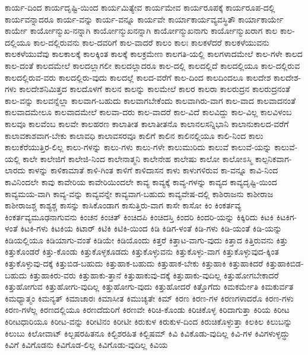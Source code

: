 {ಕಾರ್ಯ-ದಿಂದ
ಕಾರ್ಯದೃಷ್ಟಿ-ಯಿಂದ
ಕಾರ್ಯಮಿತ್ಯೇವ
ಕಾರ್ಯಮೇವ
ಕಾರ್ಯರೂಪಕ್ಕೆ
ಕಾರ್ಯರೂಪ-ದಲ್ಲಿ
ಕಾರ್ಯವನ್ನಾದರೂ
ಕಾರ್ಯ-ವನ್ನು
ಕಾರ್ಯ-ವನ್ನೂ
ಕಾರ್ಯವೇ
ಕಾರ್ಯಾಕಾರ್ಯವ್ಯವಸ್ಥಿತೌ
ಕಾರ್ಯಾಕಾರ್ಯೇ
ಕಾರ್ಯೇ
ಕಾರ್ಯೋನ್ಮುಖ-ನನ್ನಾಗಿ
ಕಾರ್ಯೋನ್ಮುಖನನ್ನಾಗಿ
ಕಾರ್ಯೋನ್ಮುಖನಾಗು
ಕಾರ್ಯೋನ್ಮುಖರಾಗ
ಕಾಲ
ಕಾಲ-ದಲ್ಲಿಯೂ
ಕಾಲ-ದಲ್ಲಿರುವನು
ಕಾಲ-ದವರಿಗೆ
ಕಾಲ-ವಾದರೆ
ಕಾಲಂ
ಕಾಲಃ
ಕಾಲಕಳೆದರೆ
ಕಾಲಕಳೆಯುವನು
ಕಾಲಕಳೆಯುವೆವು
ಕಾಲಕಾಲಕ್ಕೆ
ಕಾಲಕ್ಕಿಂತ
ಕಾಲಕ್ಕೆ
ಕಾಲಕ್ರಮೇಣ
ಕಾಲಗತಿ-ಯಲ್ಲಿ
ಕಾಲಗಳಾದಮೇಲೆ
ಕಾಲ-ಗಳೇ
ಕಾಲದ
ಕಾಲ-ದಂತೆ
ಕಾಲದಮೇಲೆ
ಕಾಲದಲ್ಲಾಗಲೀ
ಕಾಲದಲ್ಲಾದರೂ
ಕಾಲ-ದಲ್ಲಿ
ಕಾಲದಲ್ಲಿದೆ
ಕಾಲದಲ್ಲಿಯೂ
ಕಾಲ-ದಲ್ಲಿರುವ
ಕಾಲದಲ್ಲಿರುವ-ವರು
ಕಾಲದಲ್ಲಿರು-ವುದು
ಕಾಲದಲ್ಲೆ
ಕಾಲದ-ವರೆಗೆ
ಕಾಲ-ದಿಂದ
ಕಾಲದಿಂದಲೂ
ಕಾಲದೇಶ
ಕಾಲದೇಶ-ಗಳು
ಕಾಲದೇಶನಿಮಿತ್ತದ
ಕಾಲದೊಳಗೆ
ಕಾಲನ
ಕಾಲನ್ನು
ಕಾಲಮೇಲೆ
ಕಾಲರ
ಕಾಲರಾ
ಕಾಲರುದ್ರನ
ಕಾಲರುದ್ರನಂತೆ
ಕಾಲ-ವನ್ನು
ಕಾಲವನ್ನೆಲ್ಲಾ
ಕಾಲವಾಗ-ಬಹುದು
ಕಾಲವಾಗಬೇಕೆಂದು
ಕಾಲವಾಗಿರು-ವಾಗ
ಕಾಲ-ವಾದ
ಕಾಲವಾದನಂತೆ
ಕಾಲವಾದಮೇಲೂ
ಕಾಲವಾದಮೇಲೆ
ಕಾಲವಾ-ದರು
ಕಾಲ-ವಾದರೆ
ಕಾಲ-ವಿದೆ
ಕಾಲವಿದ್ದು
ಕಾಲ-ವಿಲ್ಲ
ಕಾಲವಿಳಂಬ
ಕಾಲವೂ
ಕಾಲವೆಂಬ
ಕಾಲವೇ
ಕಾಲಹರಣ
ಕಾಲಾತೀತ
ಕಾಲಾತೀತನೊ
ಕಾಲಾನಲಸನ್ನಿಭಾನಿ
ಕಾಲಾನುಕಾಲದ-ವರೆಗೆ
ಕಾಲಾವಕಾಶವಾಗ-ಬೇಕು
ಕಾಲಾವಧಿ
ಕಾಲಾವಸರವೂ
ಕಾಲಿಗೆ
ಕಾಲಿನ
ಕಾಲಿನಲ್ಲಿಯೂ
ಕಾಲಿ-ನಿಂದ
ಕಾಲು
ಕಾಲುಕೆರೆಯುತ್ತಿರ-ಲಿಲ್ಲ
ಕಾಲು-ಗಳನ್ನು
ಕಾಲು-ಗಳು
ಕಾಲು-ಗಳೇ
ಕಾಲುಮುರಿದು
ಕಾಲುವೆ
ಕಾಲುವೆ-ಯನ್ನು
ಕಾಲುವೆ-ಯಲ್ಲಿ
ಕಾಲೇ
ಕಾಲೇಜಿಗೆ
ಕಾಲೇಜಿ-ನಿಂದ
ಕಾಲೇನಾತ್ಮನಿ
ಕಾಲೇನೇಹ
ಕಾಲೇಷು
ಕಾಲೋ
ಕಾಲೋಽಸ್ಮಿ
ಕಾಲ್ಪನಿಕವಾಗ-ಲಾರದು
ಕಾಳನ್ನು
ಕಾಳಿಕಾಮಾತೆ
ಕಾಳಿ-ಗಿಂತ
ಕಾಳಿಗೆ
ಕಾಳಿದಾಸನ
ಕಾಳು
ಕಾಳುಗಳಿರುವ
ಕಾ-ವನ್ನೂ
ಕಾವಿ-ನಿಂದ
ಕಾವಿನಿಂದಲೇ
ಕಾವು
ಕಾವೇರಿಯ
ಕಾವೇರಿಯಿಂದಲೇ
ಕಾವ್ಯ
ಕಾವ್ಯಕ್ಕೆ
ಕಾವ್ಯ-ಗಳನ್ನು
ಕಾವ್ಯದ
ಕಾವ್ಯದೃಷ್ಟಿ-ಯಿಂದ
ಕಾವ್ಯಮಯ-ವಾಗಿ
ಕಾವ್ಯ-ವನ್ನು
ಕಾವ್ಯವನ್ನೇ
ಕಾವ್ಯವಾಗ-ಬಹುದು
ಕಾವ್ಯವೇಷ-ದಲ್ಲಿ
ಕಾಶಿರಾಜನು
ಕಾಶೀರಾಜ
ಕಾಶೀರಾಜಶ್ಚ
ಕಾಶ್ಯಶ್ಚ
ಕಾಸನ್ನು
ಕಾಸಿಕೊಂಡಾಗ
ಕಾಸುತ್ತಿರು-ವಾಗ
ಕಾಸೇ
ಕಾಸೋ
ಕಿಂ
ಕಿಂಕರ್ತವ್ಯ
ಕಿಂಕರ್ತವ್ಯಮೂಢನಾಗುವನು
ಕಿಂಚನ
ಕಿಂಚಿತ್
ಕಿಂಚಿದಪಿ
ಕಿಂಚಿದಸ್ತಿ
ಕಿಂದರಿ
ಕಿಂದರಿ-ಯನ್ನು
ಕಿಕ್ಕಿರಿದು
ಕಿಟಕಿ
ಕಿಟಕಿಗ-ಳಂತೆ
ಕಿಟಕಿ-ಗಳು
ಕಿಟಕಿಯ
ಕಿಟಾರ್
ಕಿಟಿಕಿ
ಕಿಟಿಕಿ-ಯಿಂದ
ಕಿಡಿ
ಕಿಡಿಗ-ಳಂತೆ
ಕಿಡಿ-ಗಳು
ಕಿಡಿ-ಯಂತೆ
ಕಿಡಿ-ಯನ್ನು
ಕಿಡಿಯಲ್ಲಿಯೂ
ಕಿಡಿಯಾಗು-ವಂತೆ
ಕಿಡಿಯೇ
ಕಿಡಿಯೊಂದು
ಕಿತ್ತರೆ
ಕಿತ್ತಾಟ-ವಾಗು-ವುದು
ಕಿತ್ತಾದ
ಕಿತ್ತಿರುವನು
ಕಿತ್ತು
ಕಿತ್ತುಕೊಂಡರೆ
ಕಿತ್ತು-ಕೊಂಡು
ಕಿತ್ತುಕೊಳ್ಳಕೂಡದು
ಕಿತ್ತುಕೊಳ್ಳುವನು
ಕಿತ್ತುಕೊಳ್ಳು-ವಾಗ
ಕಿತ್ತುಕೊಳ್ಳುವುದ-ಕ್ಕಿಂತ
ಕಿತ್ತುಕೊಳ್ಳುವು-ದಕ್ಕೆ
ಕಿತ್ತುಬಿಡ-ಬಹುದು
ಕಿತ್ತುಹಾಕ-ಬಹುದು
ಕಿತ್ತುಹಾಕ-ಬೇಕು
ಕಿತ್ತುಹಾಕಿ
ಕಿತ್ತುಹಾಕಿದರೆ
ಕಿತ್ತುಹಾಕಿಬಿಡ-ಬಹುದು
ಕಿತ್ತುಹಾಕಿರು-ವರು
ಕಿತ್ತುಹಾಕು-ತ್ತಾನೆ
ಕಿತ್ತುಹಾಕುವು-ದಕ್ಕೆ
ಕಿತ್ತುಹಾಕು-ವುದಿಲ್ಲ
ಕಿತ್ತುಹೋಗಬೇಕಾದರೆ
ಕಿತ್ತುಹೋಗುವ
ಕಿತ್ತುಹೋಗು-ವುದಿಲ್ಲ
ಕಿತ್ತುಹೋಗು-ವುದು
ಕಿತ್ತುಹೋದರೆ
ಕಿತ್ತೊಗೆದು
ಕಿಮಕರ್ಮೇತಿ
ಕಿಮಕುರ್ವತ
ಕಿಮಧ್ಯಾತ್ಮಂ
ಕಿಮನ್ಯತ್
ಕಿಮಾಚಾರಃ
ಕಿಮಾಸೀತ
ಕಿಮುಚ್ಯತೇ
ಕಿಮ್
ಕಿರಣ
ಕಿರಣ-ಗಳ
ಕಿರಣಗಳಾದರೊ
ಕಿರಣ-ಗಳು
ಕಿರಣ-ಗಳೆಲ್ಲ
ಕಿರಣದಲ್ಲಿಯೂ
ಕಿರಣದೆದುರಿಗೆ
ಕಿರಣವೇ
ಕಿರಿಚಿ-ಕೊಂಡು
ಕಿರಿಚಿಕೊಳ್ಳ
ಕಿರಿದಾಗುತ್ತಾ
ಕಿರಿಯ
ಕಿರೀಟ
ಕಿರೀಟಧಾರಿಯೂ
ಕಿರೀಟ-ವನ್ನು
ಕಿರೀಟಿನಂ
ಕಿರೀಟೀ
ಕಿರುಕುಳ
ಕಿರುಕುಳ-ದಿಂದ
ಕಿರುಚಿಕೊಳ್ಳುತ್ತಾ
ಕಿಲಕಿಲ
ಕಿಲುಬನ್ನು
ಕಿಲುಬು
ಕಿಲೋವಾಟ್
ಕಿಲ್ಬಷರಹಿತನೂ
ಕಿಲ್ಬಿಶರಹಿತ
ಕಿಲ್ಬಿಷಮ್
ಕಿವಿ
ಕಿವಿಕೊಡು-ವುದಿಲ್ಲ
ಕಿವಿ-ಗಳ
ಕಿವಿಗಳುಳ್ಳದ್ಧು
ಕಿವಿಗೆ
ಕಿವಿಗೊಡನು
ಕಿವಿಗೊಡ-ಲಿಲ್ಲ
ಕಿವಿಗೊಡು-ವುದಿಲ್ಲ
ಕಿವಿಯ
}
